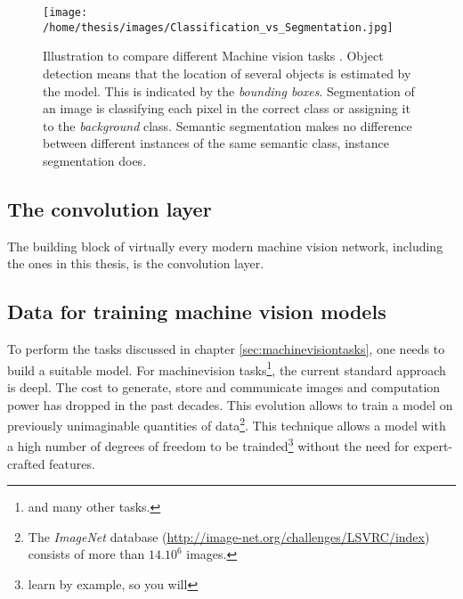 \begin{SCfigure}[][h!]
    \centering
    \texttt{[image: /home/thesis/images/Classification\_vs\_Segmentation.jpg]}
    \caption{Illustration to compare different Machine vision tasks \cite{SemTorch76:online}. 
    Object detection means that the location of several objects is estimated by the model. This is indicated by the \textit{bounding boxes}.
    Segmentation of an image is classifying each pixel in the correct class or assigning it to the \textit{background} class.
    Semantic segmentation makes no difference between different instances of the same semantic class, instance segmentation does.
    \label{fig:machinevisiontasks}}
\end{SCfigure}


\subsection{The convolution layer}

The building block of virtually every modern machine vision network, including the ones in this thesis, is the convolution layer.


\subsection{Data for training machine vision models}
\par{
    To perform the tasks discussed in chapter \ref{sec:machinevisiontasks}, one needs to build a suitable model.
    For \Gls{machinevision} tasks\footnote{and many other tasks.}, the current standard approach is \Gls{deepl}.
    The cost to generate, store and communicate images and computation power has dropped in the past decades.
    This evolution allows to train a model  on previously unimaginable quantities of data\footnote{The \textit{ImageNet} database (\url{http://image-net.org/challenges/LSVRC/index}) consists of more than $14.10^6$ images.}.
    This technique allows a model with a high number of degrees of freedom to be trainded\footnote{learn by example, so you will} without the need for expert-crafted features. 
}
